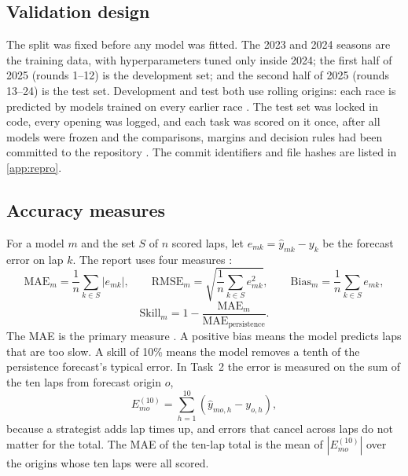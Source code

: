 \documentclass[12pt]{article}
\begin{document}
\subsection{Validation design}\label{sec:design}

The split was fixed before any model was fitted. The 2023 and 2024 seasons are the training data, with hyperparameters
tuned only inside 2024; the first half of 2025 (rounds 1--12) is the development set; and the second half of 2025 (rounds
13--24) is the test set. Development and test both use rolling origins: each race is predicted by models trained on every
earlier race \parencite{tashman2000}. The test set was locked in code, every opening was logged, and each task was scored
on it once, after all models were frozen and the comparisons, margins and decision rules had been committed to the
repository \parencite{nosek2018}. The commit identifiers and file hashes are listed in \cref{app:repro}.

\subsection{Accuracy measures}\label{sec:measures}

For a model $m$ and the set $S$ of $n$ scored laps, let $e_{mk}=\hat y_{mk}-y_k$ be the forecast error on lap $k$. The
report uses four measures \parencite{hyndman2006}:
\begin{equation}\label{eq:mae}
  \text{MAE}_m = \frac{1}{n}\sum_{k\in S}\left|e_{mk}\right|,\qquad
  \text{RMSE}_m = \sqrt{\frac{1}{n}\sum_{k\in S}e_{mk}^{2}},\qquad
  \text{Bias}_m = \frac{1}{n}\sum_{k\in S}e_{mk},
\end{equation}
\begin{equation}\label{eq:skill}
  \text{Skill}_m = 1-\frac{\text{MAE}_m}{\text{MAE}_{\text{persistence}}}.
\end{equation}
The MAE is the primary measure \parencite{willmott2005}. A positive bias means the model predicts laps that are too slow.
A skill of 10\% means the model removes a tenth of the persistence forecast's typical error. In Task~2 the error is
measured on the sum of the ten laps from forecast origin $o$,
\begin{equation}\label{eq:ten}
  E_{mo}^{(10)} = \sum_{h=1}^{10}\left(\hat y_{mo,h}-y_{o,h}\right),
\end{equation}
because a strategist adds lap times up, and errors that cancel across laps do not matter for the total. The MAE of the
ten-lap total is the mean of $|E_{mo}^{(10)}|$ over the origins whose ten laps were all scored.
\end{document}
